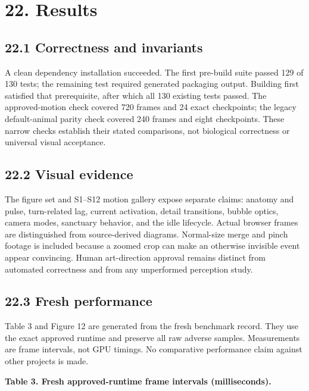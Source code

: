 \documentclass[
  english,
  11pt,
]{article}
\begin{document}
\section{22. Results}\label{results}

\subsection{22.1 Correctness and
invariants}\label{correctness-and-invariants}

A clean dependency installation succeeded. The first pre-build suite
passed 129 of 130 tests; the remaining test required generated packaging
output. Building first satisfied that prerequisite, after which all 130
existing tests passed. The approved-motion check covered 720 frames and
24 exact checkpoints; the legacy default-animal parity check covered 240
frames and eight checkpoints. These narrow checks establish their stated
comparisons, not biological correctness or universal visual acceptance.

\subsection{22.2 Visual evidence}\label{visual-evidence}

The figure set and S1--S12 motion gallery expose separate claims:
anatomy and pulse, turn-related lag, current activation, detail
transitions, bubble optics, camera modes, sanctuary behavior, and the
idle lifecycle. Actual browser frames are distinguished from
source-derived diagrams. Normal-size merge and pinch footage is included
because a zoomed crop can make an otherwise invisible event appear
convincing. Human art-direction approval remains distinct from automated
correctness and from any unperformed perception study.

\subsection{22.3 Fresh performance}\label{fresh-performance}

Table 3 and Figure 12 are generated from the fresh benchmark record.
They use the exact approved runtime and preserve all raw adverse
samples. Measurements are frame intervals, not GPU timings. No
comparative performance claim against other projects is made.

\textbf{Table 3. Fresh approved-runtime frame intervals (milliseconds).}
\end{document}
